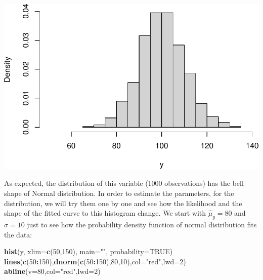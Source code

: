 \documentclass[
]{book}
\newenvironment{Shaded}{\begin{snugshade}}{\end{snugshade}}
\newcommand{\AttributeTok}[1]{\textcolor[rgb]{0.13,0.29,0.53}{#1}}
\newcommand{\ConstantTok}[1]{\textcolor[rgb]{0.56,0.35,0.01}{#1}}
\newcommand{\DecValTok}[1]{\textcolor[rgb]{0.00,0.00,0.81}{#1}}
\newcommand{\FunctionTok}[1]{\textcolor[rgb]{0.13,0.29,0.53}{\textbf{#1}}}
\newcommand{\NormalTok}[1]{#1}
\newcommand{\SpecialCharTok}[1]{\textcolor[rgb]{0.81,0.36,0.00}{\textbf{#1}}}
\newcommand{\StringTok}[1]{\textcolor[rgb]{0.31,0.60,0.02}{#1}}
\theoremstyle{definition}
\theoremstyle{definition}
\theoremstyle{definition}
\theoremstyle{definition}
\theoremstyle{remark}
\begin{document}
\includegraphics{Svetunkov---Statistics-for-Business-Analytics_files/figure-latex/unnamed-chunk-123-1.pdf}

As expected, the distribution of this variable (1000 observations) has the bell shape of Normal distribution. In order to estimate the parameters, for the distribution, we will try them one by one and see how the likelihood and the shape of the fitted curve to this histogram change. We start with \(\hat{\mu}_y=80\) and \(\hat{\sigma}=10\) just to see how the probability density function of normal distribution fits the data:

\begin{Shaded}
\begin{Highlighting}[]
\FunctionTok{hist}\NormalTok{(y, }\AttributeTok{xlim=}\FunctionTok{c}\NormalTok{(}\DecValTok{50}\NormalTok{,}\DecValTok{150}\NormalTok{), }\AttributeTok{main=}\StringTok{""}\NormalTok{, }\AttributeTok{probability=}\ConstantTok{TRUE}\NormalTok{)}
\FunctionTok{lines}\NormalTok{(}\FunctionTok{c}\NormalTok{(}\DecValTok{50}\SpecialCharTok{:}\DecValTok{150}\NormalTok{),}\FunctionTok{dnorm}\NormalTok{(}\FunctionTok{c}\NormalTok{(}\DecValTok{50}\SpecialCharTok{:}\DecValTok{150}\NormalTok{),}\DecValTok{80}\NormalTok{,}\DecValTok{10}\NormalTok{),}\AttributeTok{col=}\StringTok{"red"}\NormalTok{,}\AttributeTok{lwd=}\DecValTok{2}\NormalTok{)}
\FunctionTok{abline}\NormalTok{(}\AttributeTok{v=}\DecValTok{80}\NormalTok{,}\AttributeTok{col=}\StringTok{"red"}\NormalTok{,}\AttributeTok{lwd=}\DecValTok{2}\NormalTok{)}
\end{Highlighting}
\end{Shaded}
\end{document}
